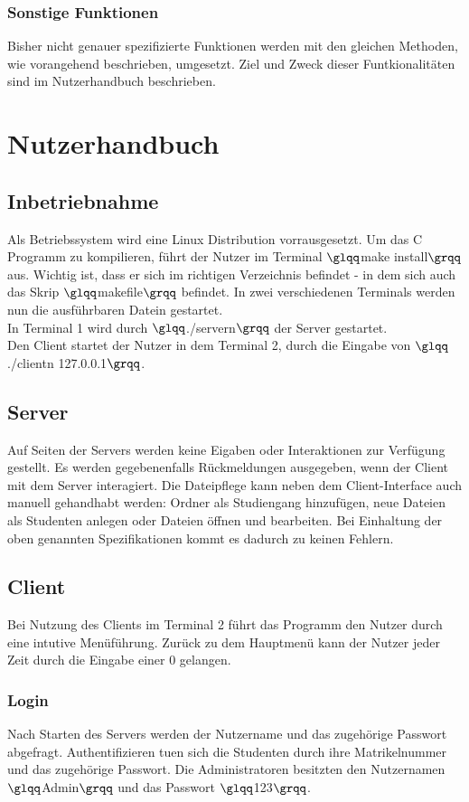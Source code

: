 \documentclass{scrartcl}
\begin{document}
		\subsubsection{Sonstige Funktionen}
			Bisher nicht genauer spezifizierte Funktionen werden mit den gleichen Methoden, wie vorangehend beschrieben, umgesetzt. Ziel und Zweck dieser Funtkionalitäten sind im Nutzerhandbuch beschrieben.
\section{Nutzerhandbuch}
	\subsection{Inbetriebnahme}
		Als Betriebssystem wird eine Linux Distribution vorrausgesetzt. Um das C Programm zu kompilieren, führt der Nutzer im Terminal $\glqq$make install$\grqq$ aus. Wichtig ist, dass er sich im richtigen Verzeichnis befindet - in dem sich auch das Skrip $\glqq$makefile$\grqq$ befindet. In zwei verschiedenen Terminals werden nun die ausführbaren Datein gestartet.\\
		In Terminal 1 wird durch $\glqq$./servern$\grqq$ der Server gestartet.\\
		Den Client startet der Nutzer in dem Terminal 2, durch die Eingabe von $\glqq$./clientn 127.0.0.1$\grqq$.
	\subsection{Server}
		Auf Seiten der Servers werden keine Eigaben oder Interaktionen zur Verfügung gestellt. Es werden gegebenenfalls Rückmeldungen ausgegeben, wenn der Client mit dem Server interagiert. Die Dateipflege kann neben dem Client-Interface auch manuell gehandhabt werden: Ordner als Studiengang hinzufügen, neue Dateien als Studenten anlegen oder Dateien öffnen und bearbeiten. Bei Einhaltung der oben genannten Spezifikationen kommt es dadurch zu keinen Fehlern.
	\subsection{Client}
		Bei Nutzung des Clients im Terminal 2 führt das Programm den Nutzer durch eine intutive Menüführung. Zurück zu dem Hauptmenü kann der Nutzer jeder Zeit durch die Eingabe einer 0 gelangen.
		\subsubsection{Login}
			Nach Starten des Servers werden der Nutzername und das zugehörige Passwort abgefragt. Authentifizieren tuen sich die Studenten durch ihre Matrikelnummer und das zugehörige Passwort. 
			Die Administratoren besitzten den Nutzernamen $\glqq$Admin$\grqq$ und das Passwort $\glqq$123$\grqq$.
\end{document}
